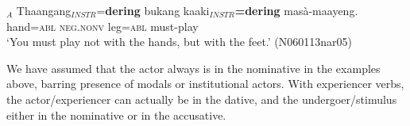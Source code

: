 \documentclass[a4paper,10pt]{article}
\begin{document}
\ea\label{ex:val:2:nomabl:instr} 
\gll \zero$_{A}$ Thaangang$_{INSTR}$=\textbf{dering} bukang kaaki$_{INSTR}$\textbf{=dering} masà-maayeng. \\
      { } hand=\textsc{abl} \textsc{neg.nonv} leg=\textsc{abl} must-play \\
    `You must play not with the hands, but with the feet.' (N060113nar05)
\z 

 


% 
% 
% 
%  
% 
%  

We have assumed that the actor always is in the nominative in the examples above, barring presence of modals or institutional actors. With experiencer verbs, the actor/experiencer can actually be in the dative, and the undergoer/stimulus either in the nominative
or in the accusative. 
\end{document}
